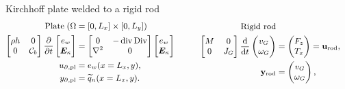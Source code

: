 \documentclass[aspectratio=169]{ISAE-Beamer}
\DeclareMathOperator*{\Div}{Div}
\renewcommand{\div}{\operatorname{div}}
\begin{document}
\begin{frame}{Kirchhoff plate welded to a rigid rod}
\begin{equation*}\small
\begin{aligned}
\text{Plate} \; (\Omega &= [0, L_x] \times [0, L_y]) \\
\begin{bmatrix}
\rho h & 0 \\ 0 & \mathcal{\bm{C}}_b \\
\end{bmatrix}
\diffp{}{t}
\begin{bmatrix}
{e}_w \\ \bm{E}_\kappa \\
\end{bmatrix} &= 
\begin{bmatrix}
0 & -\div\Div \\ \nabla^2 & 0 \\
\end{bmatrix}
\begin{bmatrix}
{e}_w \\ \bm{E}_\kappa \\
\end{bmatrix} \\
u_{\partial, \text{pl}} &= {e}_w (x = L_x, y), \\
y_{\partial, \text{pl}} &= \widetilde{q}_n(x = L_x, y).
\end{aligned} \qquad \quad
\begin{aligned}
\text{Rigid rod} \\
\begin{bmatrix}
M & 0 \\
0   & J_G \\
\end{bmatrix} 
\displaystyle \diff{}{t}
\begin{pmatrix}
v_G \\ \omega_G \\
\end{pmatrix} & = \begin{pmatrix}
F_z \\ T_x \\
\end{pmatrix} = \mathbf{u}_{\text{rod}}\vspace{1mm}, \\
\mathbf{y}_{\text{rod}} &= \begin{pmatrix}
v_G \\ \omega_{G} \\
\end{pmatrix},
\end{aligned}
\end{equation*}


\end{frame}
\end{document}
